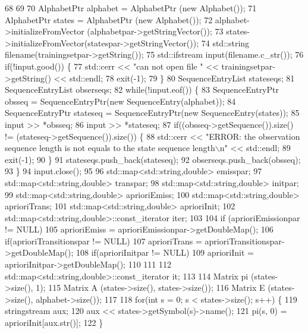 \begin{DoxyCode}
68 
69 
70     AlphabetPtr alphabet = AlphabetPtr (\textcolor{keyword}{new} Alphabet());
71     AlphabetPtr states = AlphabetPtr (\textcolor{keyword}{new} Alphabet());
72     alphabet->initializeFromVector (alphabetpar->getStringVector());
73     states->initializeFromVector(statespar->getStringVector());
74     std::string filename(trainingsetpar->getString());
75     std::ifstream input(filename.c\_str());
76     \textcolor{keywordflow}{if}(!input.good()) \{
77       std::cerr << \textcolor{stringliteral}{"can not open file "} << trainingsetpar->getString() << std::endl;
78       exit(-1);
79     \}
80     SequenceEntryList stateseqs;
81     SequenceEntryList obserseqs;
82     \textcolor{keywordflow}{while}(!input.eof()) \{
83     SequenceEntryPtr obsseq = SequenceEntryPtr(\textcolor{keyword}{new} SequenceEntry(alphabet));
84     SequenceEntryPtr stateseq = SequenceEntryPtr(\textcolor{keyword}{new} SequenceEntry(states));
85     input >> *obsseq;
86     input >> *stateseq;
87     \textcolor{keywordflow}{if}((obsseq->getSequence()).size() != (stateseq->getSequence()).size()) \{
88       std::cerr << \textcolor{stringliteral}{"ERROR: the observation sequence length is not equals to the state sequence length\(\backslash\)n"} <<
       std::endl;
89       exit(-1);
90     \}
91         stateseqs.push\_back(stateseq);
92         obserseqs.push\_back(obsseq);
93     \}
94     input.close();
95 
96     std::map<std::string,double> emisspar;
97     std::map<std::string,double> transpar;
98     std::map<std::string,double> initpar;
99     std::map<std::string,double> aprioriEmiss;
100     std::map<std::string,double> aprioriTrans; 
101     std::map<std::string,double> aprioriInit;
102     std::map<std::string,double>::const\_iterator iter;
103 
104     \textcolor{keywordflow}{if} (aprioriEmissionpar != NULL) 
105       aprioriEmiss = aprioriEmissionpar->getDoubleMap();
106     \textcolor{keywordflow}{if}(aprioriTransitionspar != NULL)
107       aprioriTrans = aprioriTransitionspar->getDoubleMap();
108     \textcolor{keywordflow}{if}(aprioriInitpar != NULL)
109       aprioriInit = aprioriInitpar->getDoubleMap();
110 
111    
112     std::map<std::string,double>::const\_iterator it;  
113 
114     Matrix pi (states->size(), 1);
115     Matrix A (states->size(), states->size());
116     Matrix E (states->size(), alphabet->size()); 
117     
118     \textcolor{keywordflow}{for}(\textcolor{keywordtype}{int} s = 0; s < states->size(); s++) \{
119       stringstream aux;
120       aux << states->getSymbol(s)->name();
121       pi(s, 0) = aprioriInit[aux.str()];
122     \}

\end{DoxyCode}
